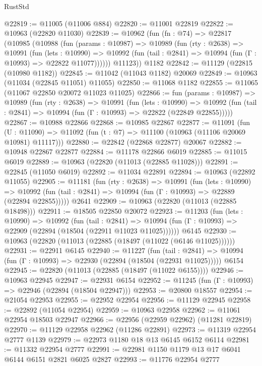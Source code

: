 \begin{lexlean}{RustStd}
\begin{coremodule}
@22819 := @11005 (@11006 @884)
@22820 := @11001 @22819
@22822 := @10963 (@22820 @11030)
@22839 := @10962
    (fun (fn : @74) =>
    @22817
      (@10985
        (@10988
          (fun (params : @10987) =>
          @10989
            (fun (rty : @2638) =>
            @10991
              (fun (lets : @10990) =>
              @10992 (fun (tail : @2841) => @10994 (fun (Γ : @10993) => @22822 @11077))))))
        @11123))
    @1182
@22842 := @11129 (@22815 (@10980 @1182))
@22845 := @11042 (@11043 @1182) @20069
@22849 := @10963 (@11034 (@22845 @11051) @11055)
@22850 := @11068 @1182
@22855 := @11065 (@11067 @22850 @20072 @11023 @11025)
@22866 := fun (params : @10987) =>
  @10989
    (fun (rty : @2638) =>
    @10991
      (fun (lets : @10990) =>
      @10992 (fun (tail : @2841) => @10994 (fun (Γ : @10993) => @22822 (@22849 @22855)))))
@22867 := @10988 @22866
@22868 := @10985 @22867
@22877 := @11091
    (fun (U : @11090) => @11092 (fun (t : @7) => @11100 (@10963 (@11106 @20069 @10981) @11117)))
@22880 := @22842 (@22868 @22877) @20067
@22882 := @10948 @22867 @22877
@22884 := @11178 @22866 @6019
@22885 := @11015 @6019
@22889 := @10963 (@22820 (@11013 (@22885 @11028)))
@22891 := @22845 (@11050 @6019)
@22892 := @11034 @22891
@22894 := @10963 (@22892 @11055)
@22905 := @11181
    (fun (rty : @2638) =>
    @10991
      (fun (lets : @10990) =>
      @10992 (fun (tail : @2841) => @10994 (fun (Γ : @10993) => @22889 (@22894 @22855)))))
    @2641
@22909 := @10963 (@22820 (@11013 (@22885 @18498)))
@22911 := @18505 @22850 @20072
@22923 := @11203
    (fun (lets : @10990) =>
    @10992
      (fun (tail : @2841) =>
      @10994 (fun (Γ : @10993) => @22909 (@22894 (@18504 (@22911 @11023 @11025))))))
    @6145
@22930 := @10963 (@22820 (@11013 (@22885 (@18497 (@11022 (@6146 @11025))))))
@22931 := @22911 @6145
@22940 := @11227
    (fun (tail : @2841) => @10994 (fun (Γ : @10993) => @22930 (@22894 (@18504 (@22931 @11025)))))
    @6154
@22945 := @22820 (@11013 (@22885 (@18497 (@11022 @6155))))
@22946 := @10963 @22945
@22947 := @22931 @6154
@22952 := @11245 (fun (Γ : @10993) => @22946 (@22894 (@18504 @22947)))
@22953 := @20800 @18557
@22954 := @21054 @22953
@22955 := @22952 @22954
@22956 := @11129 @22945
@22958 := @22892 (@11054 @22954)
@22959 := @10963 @22958
@22962 := @11061 @22954 @18503 @22947
@22966 := @22956 (@22959 @22962) (@11281 @22819)
@22970 := @11129 @22958 @22962 (@11286 @22891)
@22973 := @11319 @22954 @2777 @1139
@22979 := @22973 @1180 @18 @13 @6145 @6152 @6114
@22981 := @11332 @22954 @2777
@22991 := @22981 @1150 @1179 @13 @17 @6041 @6144 @6151 @2821 @6025 @2827
@22993 := @11776 @22954 @2777

\end{coremodule}
\end{lexlean}

